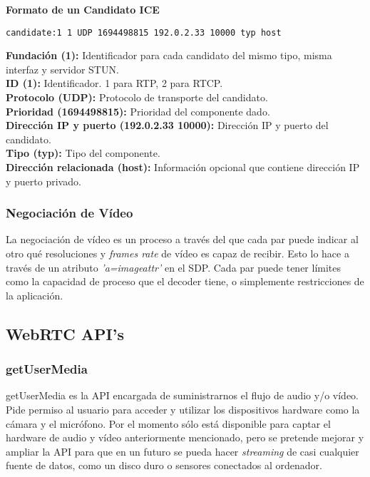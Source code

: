 \begin{normalsize}
\noindent \textbf{Formato de un Candidato ICE}\\
\end{normalsize}

\begin{lstlisting}[caption=Ejemplo paquete SDP]
candidate:1 1 UDP 1694498815 192.0.2.33 10000 typ host
\end{lstlisting}

\noindent \textbf{Fundación (1):} Identificador para cada candidato del mismo tipo, misma interfaz y servidor STUN.\\
\textbf{ID (1):} Identificador. 1 para RTP, 2 para RTCP.\\
\textbf{Protocolo (UDP):} Protocolo de transporte del candidato.\\
\textbf{Prioridad (1694498815): }Prioridad del componente dado.\\
\textbf{Dirección IP y puerto (192.0.2.33 10000): }Dirección IP y puerto del candidato.\\
\textbf{Tipo (typ):} Tipo del componente.\\
\textbf{Dirección relacionada (host):} Información opcional que contiene dirección IP y puerto privado.\\

\subsubsection{Negociación de Vídeo}

La negociación de vídeo es un proceso a través del que cada par puede indicar al otro qué resoluciones y \textit{frames rate} de vídeo es capaz de recibir. Esto lo hace a través de un atributo \textit{'a=imageattr'} en el SDP. Cada par puede tener límites como la capacidad de proceso que el decoder tiene, o simplemente restricciones de la aplicación.\\


\subsection{WebRTC API's}

\subsubsection{getUserMedia} 

getUserMedia es la API encargada de suministrarnos el flujo de audio y/o vídeo. Pide permiso al usuario para acceder y utilizar los dispositivos hardware como la cámara y el micrófono. Por el momento sólo está disponible para captar el hardware de audio y vídeo anteriormente mencionado, pero se pretende mejorar y ampliar la API para que en un futuro se pueda hacer \emph{streaming} de casi cualquier fuente de datos, como un disco duro o sensores conectados al ordenador.\\

